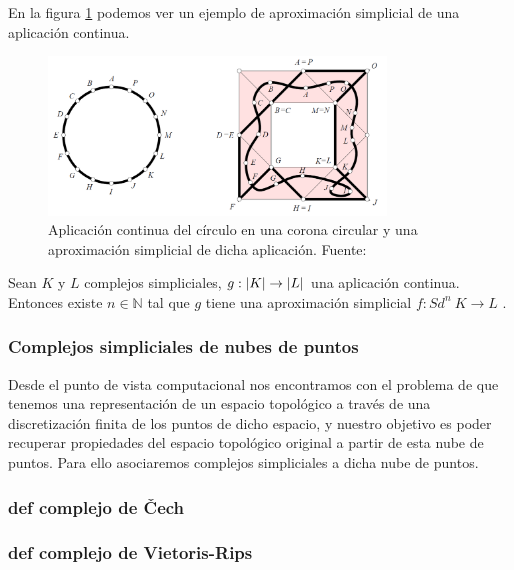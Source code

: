 En la figura \ref{ref:aproxSimp} podemos ver un ejemplo de aproximación simplicial de una aplicación continua.

\begin{figure}[!ht]
\centering
\includegraphics[width=0.8\textwidth]{include/figuras/aproximacionSimplicial.png} 
\caption{Aplicación continua del círculo en una corona circular y una aproximación simplicial de dicha aplicación. Fuente: \cite{libroEH}}
\label{ref:aproxSimp}
\end{figure}

\begin{theorem}
\label{ref:teoremaAproximacionSimplicial}
\begin{sloppypar}
Sean $K$ y $L$ complejos simpliciales, ${g: \lvert K\rvert \to \lvert L\rvert}$ una aplicación continua. Entonces existe $n \in \mathbb{N}$ tal que $g$ tiene una aproximación simplicial ${f: \textit{Sd}^{n}\ K \to L}$  \cite{libroEH}.
\end{sloppypar}
\end{theorem}

\subsubsection*{Complejos simpliciales de nubes de puntos}
Desde el punto de vista computacional nos encontramos con el problema de que tenemos una representación de un espacio topológico a través de una discretización finita de los puntos de dicho espacio, y nuestro objetivo es poder recuperar propiedades del espacio topológico original a partir de esta nube de puntos. Para ello asociaremos complejos simpliciales a dicha nube de puntos.

\subsubsection*{def complejo de \v{C}ech}
\subsubsection*{def complejo de Vietoris-Rips}
